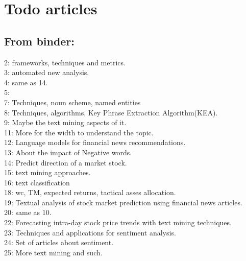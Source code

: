 \chapter{Todo articles}

\section{From binder:}
2: frameworks, techniques and metrics.\\
3: automated new analysis.\\
4: same as 14. \\
5:\\
7: Techniques, noun scheme, named entities \\
8: Techniques, algorithms, Key Phrase Extraction Algorithm(KEA).\\
9: Maybe the text mining aspects of it. \\
11: More for the width to understand the topic. \\
12: Language models for financial news recommendations. \\
13: About the impact of Negative words. \\
14: Predict direction of a market stock. \\
15: text mining approaches. \\
16: text classification\\
18: wc, TM, expected returns, tactical asses allocation. \\
19: Textual analysis of stock market prediction using financial news articles. \\
20: same as 10.\\
22: Forecasting intra-day stock price trends with text mining techniques.\\
23: Techniques and applications for sentiment analysis. \\
24: Set of articles about sentiment. \\
25: More text mining and such. \\

